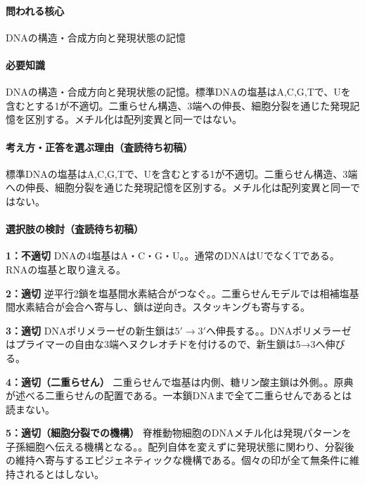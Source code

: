 \paragraph{問われる核心} DNAの構造・合成方向と発現状態の記憶

\paragraph{必要知識} DNAの構造・合成方向と発現状態の記憶。標準DNAの塩基はA,C,G,Tで、Uを含むとする1が不適切。二重らせん構造、3端への伸長、細胞分裂を通じた発現記憶を区別する。メチル化は配列変異と同一ではない。

\paragraph{考え方・正答を選ぶ理由（査読待ち初稿）} 標準DNAの塩基はA,C,G,Tで、Uを含むとする1が不適切。二重らせん構造、3端への伸長、細胞分裂を通じた発現記憶を区別する。メチル化は配列変異と同一ではない。

\paragraph{選択肢の検討（査読待ち初稿）}\mbox{}\par

\noindent\textbf{1：不適切} DNAの4塩基はA・C・G・U。。通常のDNAはUでなくTである。RNAの塩基と取り違える。\par

\noindent\textbf{2：適切} 逆平行2鎖を塩基間水素結合がつなぐ。。二重らせんモデルでは相補塩基間水素結合が会合へ寄与し、鎖は逆向き。スタッキングも寄与する。\par

\noindent\textbf{3：適切} DNAポリメラーゼの新生鎖は\(5'\to3'\)へ伸長する。。DNAポリメラーゼはプライマーの自由な3端へヌクレオチドを付けるので、新生鎖は5→3へ伸びる。\par

\noindent\textbf{4：適切（二重らせん）} 二重らせんで塩基は内側、糖リン酸主鎖は外側。。原典が述べる二重らせんの配置である。一本鎖DNAまで全て二重らせんであるとは読まない。\par

\noindent\textbf{5：適切（細胞分裂での機構）} 脊椎動物細胞のDNAメチル化は発現パターンを子孫細胞へ伝える機構となる。。配列自体を変えずに発現状態に関わり、分裂後の維持へ寄与するエピジェネティックな機構である。個々の印が全て無条件に維持されるとはしない。\par

